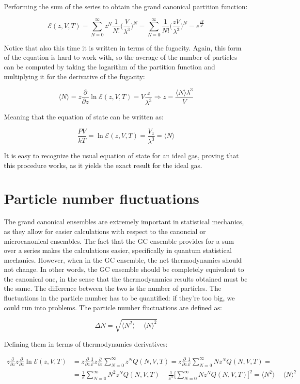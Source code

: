 	Performing the sum of the series to obtain the grand canonical partition function:

	$$\mathcal{E}(z, V, T) = \sum\limits_{N=0}^{\infty}z^N\frac{1}{N!}\biggl(\frac{V}{\lambda^3}\biggr)^{N} = \sum\limits_{N=0}^{\infty}\frac{1}{N!}\biggl(\frac{zV}{\lambda^3}\biggr)^{N} = e^{\frac{zV}{\lambda^3}}$$

	Notice that also this time it is written in terms of the fugacity.
	Again, this form of the equation is hard to work with, so the average of the number of particles can be computed by taking the logarithm of the partition function and multiplying it for the derivative of the fugacity:

	$$\langle N\rangle = z\frac{\partial}{\partial z}\ln\mathcal{E}(z, V, T) = V\frac{z}{\lambda^3}\Rightarrow z = \frac{\langle N\rangle\lambda^3}{V}$$

	Meaning that the equation of state can be written as:

	$$\frac{PV}{kT} = \ln\mathcal{E}(z, V, T) = \frac{V_z}{\lambda^3}= \langle N\rangle$$

	It is easy to recognize the usual equation of state for an ideal gas, proving that this procedure works, as it yields the exact result for the ideal gas.

\section{Particle number fluctuations}
The grand canonical ensembles are extremely important in statistical mechanics, as they allow for easier calculations with respect to the canoncial or microcanonical ensembles.
The fact that the GC ensemble provides for a sum over a series makes the calculations easier, specifically in quantum statistical mechanics.
However, when in the GC ensemble, the net thermodynamics should not change.
In other words, the GC ensemble should be completely equivalent to the canonical one, in the sense that the thermodyanmics results obtained must be the same.
The difference between the two is the number of particles.
The fluctuations in the particle number has to be quantified: if they're too big, we could run into problems.
The particle number fluctuations are defined as:

$$\Delta N = \sqrt{\langle N^2\rangle-\langle N\rangle^2}$$

Defining them in terms of thermodynamics derivatives:

\begin{align*}
	z\frac{\partial}{\partial z}z\frac{\partial}{\partial z}\ln\mathcal{E}(z, V, T) &= z\frac{\partial}{\partial z}\frac{1}{\mathcal{E}}z\frac{\partial}{\partial z}\sum\limits_{N=0}^{\infty}z^NQ(N, V, T) = z\frac{\partial}{\partial z}\frac{1}{\mathcal{E}}\sum\limits_{N=0}^{\infty}Nz^N Q(N, V, T)=\\
																																									&=\frac{1}{\mathcal{E}}\sum\limits_{N=0}^{\infty}N^2z^NQ(N, V, T)-\frac{1}{\mathcal{E}^2}\biggl[\sum\limits_{N=0}^{\infty}Nz^NQ(N, V, T)\biggr]^2 = \langle N^2\rangle - \langle N\rangle^2
\end{align*}

